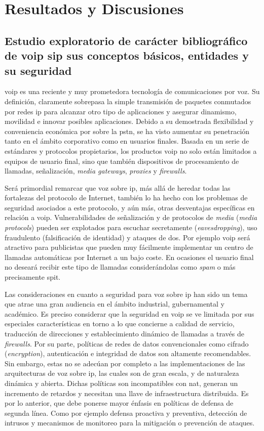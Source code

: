 \documentclass[a4paper,12pt]{report}
\begin{document}
\chapter{Resultados y Discusiones}

\section{Estudio exploratorio de carácter bibliográfico de \ac{voip} \ac{sip} sus
conceptos básicos, entidades y su seguridad}

\ac{voip} es una reciente y muy prometedora
tecnología de comunicaciones por voz. Su definición, claramente sobrepasa la
simple transmisión de paquetes conmutados por redes \ac{ip} para alcanzar otro tipo
de aplicaciones y asegurar dinamismo, movilidad e innovar posibles aplicaciones.
Debido a su demostrada flexibilidad y conveniencia económica por sobre la \ac{pstn},
se ha visto aumentar su penetración tanto en el ámbito
corporativo como en usuarios finales. Basada en un serie de estándares y
protocolos pro\-pie\-ta\-rios, los productos \ac{voip} no solo están limitados a equipos de
usuario final, sino que también dispositivos de procesamiento de llamadas,
señalización, \emph{media gateways}, \emph{proxies} y \emph{firewalls}.
 
Será primordial remarcar que voz sobre \ac{ip}, más allá de heredar todas las
fortalezas del protocolo de Internet, también lo ha hecho con los problemas de
seguridad asociados a este protocolo, y aún más, otras desventajas específicas
en relación a \ac{voip}. Vulnerabilidades de señalización y de protocolos de \emph{media}
(\emph{media protocols}) pueden ser explotados para escuchar secretamente
(\emph{eavesdropping}), uso fraudulento (falsificación de identidad) y ataques
de \ac{dos}. Por
ejemplo \ac{voip} será atractivo para publicistas que pueden muy fácilmente
implementar un centro de llamadas automáticas por Internet a un bajo coste. En
ocasiones el usuario final no deseará recibir este tipo de llamadas
considerándolas como \emph{spam} o más precisamente \ac{spit}.

Las consideraciones en cuanto a seguridad para voz sobre \ac{ip} han sido un
tema que atrae una gran audiencia en el ámbito industrial, gubernamental y
académico. Es preciso considerar que la seguridad en \ac{voip} se ve limitada por
sus especiales características en torno a lo que concierne a calidad de
servicio, traducción de direcciones y establecimiento dinámico de llamadas a
través de \emph{firewalls}. Por su parte, políticas de redes de datos convencionales
como cifrado (\emph{\mbox{encryption}}), autenticación e integridad de datos son
altamente recomendables. Sin embargo, estas no se adecúan por completo a las
implementaciones de las arquitecturas de voz sobre \ac{ip}, las cuales son de gran
escala, y de naturaleza dinámica y abierta. Dichas políticas son incompatibles
con \ac{nat}, generan un incremento de retardos
y necesitan una llave de infraestructura distribuida. Es por lo anterior, que
debe ponerse mayor énfasis en políticas de defensa de segunda línea. Como por
ejemplo defensa proactiva y preventiva, detección de intrusos y mecanismos de
monitoreo para la mitigación o prevención de ataques. 
\end{document}
